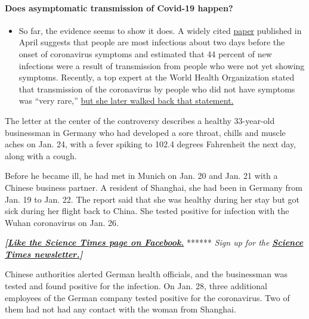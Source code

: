 \begin{itemize}
{  \paragraph{Does asymptomatic transmission of Covid-19
  happen?}\label{does-asymptomatic-transmission-of-covid-19-happen}}

  \begin{itemize}
  \tightlist
  \item
    So far, the evidence seems to show it does. A widely cited
    \href{https://www.nature.com/articles/s41591-020-0869-5}{paper}
    published in April suggests that people are most infectious about
    two days before the onset of coronavirus symptoms and estimated that
    44 percent of new infections were a result of transmission from
    people who were not yet showing symptoms. Recently, a top expert at
    the World Health Organization stated that transmission of the
    coronavirus by people who did not have symptoms was ``very rare,''
    \href{https://www.nytimes.com/2020/06/09/world/coronavirus-updates.html?action=click\&pgtype=Article\&state=default\&region=MAIN_CONTENT_3\&context=storylines_faq\#link-1f302e21}{but
    she later walked back that statement.}
  \end{itemize}
\end{itemize}

The letter at the center of the controversy describes a healthy
33-year-old businessman in Germany who had developed a sore throat,
chills and muscle aches on Jan. 24, with a fever spiking to 102.4
degrees Fahrenheit the next day, along with a cough.

Before he became ill, he had met in Munich on Jan. 20 and Jan. 21 with a
Chinese business partner. A resident of Shanghai, she had been in
Germany from Jan. 19 to Jan. 22. The report said that she was healthy
during her stay but got sick during her flight back to China. She tested
positive for infection with the Wuhan coronavirus on Jan. 26.

\textbf{\emph{{[}}\href{http://on.fb.me/1paTQ1h}{\emph{Like the Science
Times page on Facebook.}}} ****** \emph{\textbar{} Sign up for the}
\textbf{\href{http://nyti.ms/1MbHaRU}{\emph{Science Times
newsletter.}}\emph{{]}}}

Chinese authorities alerted German health officials, and the businessman
was tested and found positive for the infection. On Jan. 28, three
additional employees of the German company tested positive for the
coronavirus. Two of them had not had any contact with the woman from
Shanghai.

